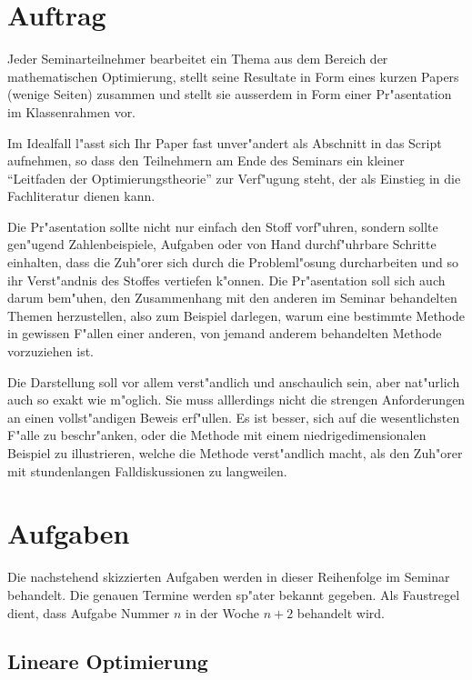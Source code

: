 \documentclass[a4paper,12pt]{article}
\begin{document}
\section{Auftrag}
Jeder Seminarteilnehmer bearbeitet ein Thema aus dem Bereich der
mathematischen Optimierung, stellt seine Resultate in Form eines
kurzen Papers (wenige Seiten) zusammen und stellt sie ausserdem
in Form einer Pr"asentation im Klassenrahmen vor.

Im Idealfall l"asst sich Ihr Paper fast unver"andert als Abschnitt
in das Script aufnehmen, so dass den Teilnehmern am Ende des Seminars
ein kleiner ``Leitfaden der Optimierungstheorie'' zur Verf"ugung steht,
der als Einstieg in die Fachliteratur dienen kann.

Die Pr"asentation sollte nicht nur einfach den Stoff vorf"uhren,
sondern sollte gen"ugend Zahlenbeispiele, Aufgaben oder von Hand
durchf"uhrbare Schritte einhalten, dass die Zuh"orer sich durch
die Probleml"osung durcharbeiten und so ihr Verst"andnis des
Stoffes vertiefen k"onnen. Die Pr"asentation soll sich auch darum
bem"uhen, den Zusammenhang mit den anderen im Seminar behandelten
Themen herzustellen, also zum Beispiel darlegen, warum eine bestimmte
Methode in gewissen F"allen einer anderen, von jemand anderem behandelten
Methode vorzuziehen ist.

Die Darstellung soll vor allem verst"andlich und anschaulich
sein, aber nat"urlich auch so exakt wie m"oglich.
Sie muss alllerdings nicht die strengen Anforderungen an einen
vollst"andigen Beweis erf"ullen. Es ist besser, sich auf die
wesentlichsten F"alle zu beschr"anken, oder die Methode mit
einem niedrigedimensionalen Beispiel zu illustrieren, welche
die Methode verst"andlich macht, als den Zuh"orer mit stundenlangen
Falldiskussionen zu langweilen.

\section{Aufgaben}
Die nachstehend skizzierten Aufgaben werden in dieser Reihenfolge im
Seminar behandelt. Die genauen Termine werden sp"ater bekannt
gegeben. Als Faustregel dient, dass Aufgabe Nummer $n$ in der Woche
$n + 2$ behandelt wird.

\newtheorem{aufgabe}{Aufgabe}

\subsection{Lineare Optimierung}



\end{document}
